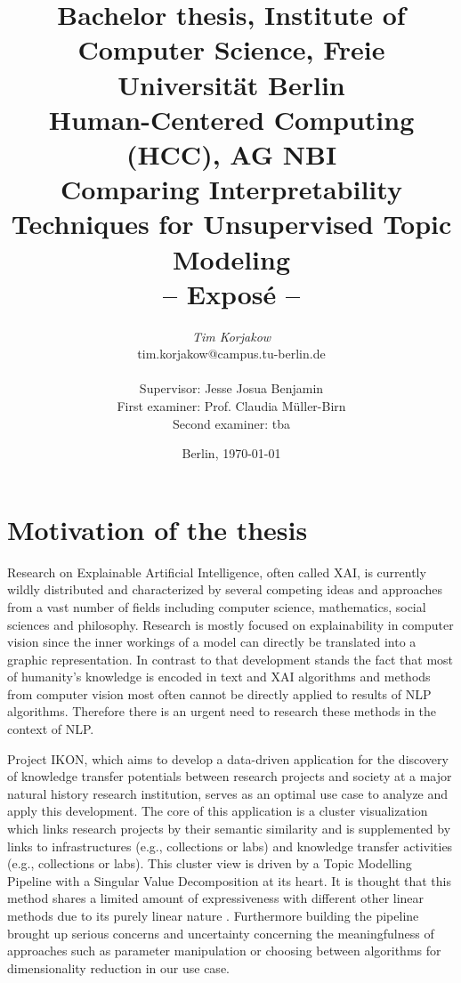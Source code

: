 \documentclass[pdftex,a4paper,12pt]{scrartcl}
\title{
{\small Bachelor thesis, Institute of Computer Science, Freie Universität Berlin}\\
{\small Human-Centered Computing (HCC), AG NBI}\\
[6ex]
{\LARGE Comparing Interpretability Techniques for Unsupervised Topic Modeling}\\
{\normalsize-- Exposé --}}
\author{
{\emph{\normalsize Tim Korjakow}}\\
{\normalsize tim.korjakow@campus.tu-berlin.de}\\\\
{\normalsize Supervisor: Jesse Josua Benjamin } \\
{\normalsize First examiner: Prof. Claudia Müller-Birn} \\
{\normalsize Second examiner: tba } \\
}
\date{\normalsize Berlin, \today}
\newcommand{\blankpage}{
\newpage
\thispagestyle{empty}
\mbox{}
\newpage
}
\begin{document}
\maketitle 

\thispagestyle{empty}  %

\blankpage


\setcounter{page}{1} %

\section{Motivation of the thesis} 

Research on Explainable Artificial Intelligence, often called XAI, is currently wildly distributed and characterized by several competing ideas and approaches from a vast number of fields including computer science, mathematics, social sciences and philosophy. Research is mostly focused on explainability in computer vision since the inner workings of a model can directly be translated into a graphic representation. In contrast to that development stands the fact that most of humanity's knowledge is encoded in text and XAI algorithms and methods from computer vision most often cannot be directly applied to results of NLP algorithms. Therefore there is an urgent need to research these methods in the context of NLP.

Project IKON, which aims to develop a data-driven application for the discovery of knowledge transfer potentials between research projects and society at a major natural history research institution, serves as an optimal use case to analyze and apply this development. The core of this application is a cluster visualization which links research projects by their semantic similarity and is supplemented by links to infrastructures (e.g., collections or labs) and knowledge transfer activities (e.g., collections or labs). This cluster view is driven by a Topic Modelling Pipeline with a Singular Value Decomposition at its heart. It is thought that this method shares a limited amount of expressiveness with different other linear methods due to its purely linear nature \cite{arrasWhatRelevantText2017}. Furthermore building the pipeline brought up serious concerns and uncertainty concerning the meaningfulness of approaches such as parameter manipulation or choosing between algorithms for dimensionality reduction \cite{benjaminTransparencyMediationMeaning2018} in our use case.
\end{document}
